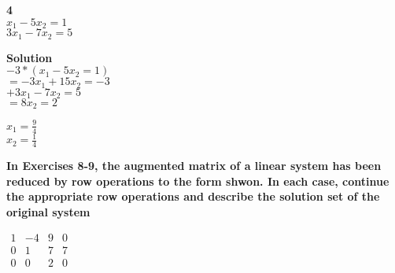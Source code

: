 \documentclass{article}
\begin{document}
\bf{4}\\
$x_{1} - 5x_{2} = 1$\\
$3x_{1} - 7x_{2} = 5$

\bf{Solution}\\
$-3*(x_{1} - 5x_{2} = 1)$\\
$=-3x_{1}+15x_{2} = -3$\\
$+ 3x_{1} - 7x_{2} = 5$\\
$= 8x_{2} = 2$

$x_{1} = \frac{9}{4}$\\
$x_{2} = \frac{1}{4}$

\bf{In Exercises 8-9, the augmented matrix of a linear system has been reduced by row operations to the form shwon. In each case, continue the appropriate row operations and describe the solution set of the original system}

$
\begin{matrix}
1 & -4 & 9 & 0\\
0 & 1 & 7 &  7\\
0 & 0 & 2 &  0
\end{matrix}
$
\end{document}
